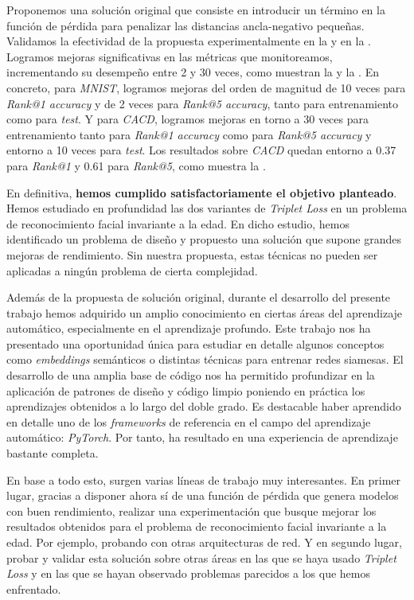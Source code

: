 Proponemos una solución original que consiste en introducir un término en la función de pérdida para penalizar las distancias ancla-negativo pequeñas. Validamos la efectividad de la propuesta experimentalmente en la  y en la . Logramos mejoras significativas en las métricas que monitoreamos, incrementando su desempeño entre 2 y 30 veces, como muestran la  y la . En concreto, para \textit{MNIST}, logramos mejoras del orden de magnitud de 10 veces para \textit{Rank@1 accuracy} y de 2 veces para \textit{Rank@5 accuracy}, tanto para entrenamiento como para \textit{test}. Y para \textit{CACD}, logramos mejoras en torno a 30 veces para entrenamiento tanto para \textit{Rank@1 accuracy} como para \textit{Rank@5 accuracy} y entorno a 10 veces para \textit{test}. Los resultados sobre \textit{CACD} quedan entorno a 0.37 para \textit{Rank@1} y 0.61 para \textit{Rank@5}, como muestra la .

En definitiva, \textbf{hemos cumplido satisfactoriamente el objetivo planteado}. Hemos estudiado en profundidad las dos variantes de \textit{Triplet Loss} en un problema de reconocimiento facial invariante a la edad. En dicho estudio, hemos identificado un problema de diseño y propuesto una solución que supone grandes mejoras de rendimiento. Sin nuestra propuesta, estas técnicas no pueden ser aplicadas a ningún problema de cierta complejidad.

Además de la propuesta de solución original, durante el desarrollo del presente trabajo hemos adquirido un amplio conocimiento en ciertas áreas del aprendizaje automático, especialmente en el aprendizaje profundo. Este trabajo nos ha presentado una oportunidad única para estudiar en detalle algunos conceptos como \textit{embeddings} semánticos o distintas técnicas para entrenar redes siamesas. El desarrollo de una amplia base de código nos ha permitido profundizar en la aplicación de patrones de diseño y código limpio poniendo en práctica los aprendizajes obtenidos a lo largo del doble grado. Es destacable haber aprendido en detalle uno de los \textit{frameworks} de referencia en el campo del aprendizaje automático: \textit{PyTorch}. Por tanto, ha resultado en una experiencia de aprendizaje bastante completa.

En base a todo esto, surgen varias líneas de trabajo muy interesantes. En primer lugar, gracias a disponer ahora sí de una función de pérdida que genera modelos con buen rendimiento, realizar una experimentación que busque mejorar los resultados obtenidos para el problema de reconocimiento facial invariante a la edad. Por ejemplo, probando con otras arquitecturas de red. Y en segundo lugar, probar y validar esta solución sobre otras áreas en las que se haya usado \textit{Triplet Loss} y en las que se hayan observado problemas parecidos a los que hemos enfrentado.
